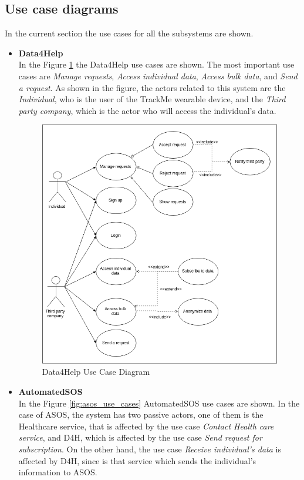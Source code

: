 \documentclass[12pt]{report}
\begin{document}
\subsection{Use case diagrams}
In the current section the use cases for all the subsystems are shown.

\begin{itemize}
\item{\textbf{Data4Help}} \\
In the Figure \ref{fig:d4h_use_cases} the Data4Help use cases are shown. The most important use cases are \textit{Manage requests}, \textit{Access individual data}, \textit{Access bulk data}, and \textit{Send a request}. As shown in the figure, the actors related to this system are the \textit{Individual}, who is the user of the TrackMe wearable device, and the \textit{Third party company}, which is the actor who will access the individual's data.

\begin{figure}[H]
\centering
	\includegraphics[scale=0.5]{Diagrams/d4h_use_cases.png}
\caption[Data4Help Use Case Diagram]{Data4Help Use Case Diagram}
\label{fig:d4h_use_cases}
\end{figure}

\item{\textbf{AutomatedSOS}}\\
In the Figure \ref{fig:asos_use_cases} AutomatedSOS use cases are shown. In the case of ASOS, the system has two passive actors, one of them is the Healthcare service, that is affected by the use case \textit{Contact Health care service}, and D4H, which is affected by the use case \textit{Send request for subscription}. On the other hand, the use case \textit{Receive individual's data} is affected by D4H, since is that service which sends the individual's information to ASOS.


\end{itemize}
\end{document}
